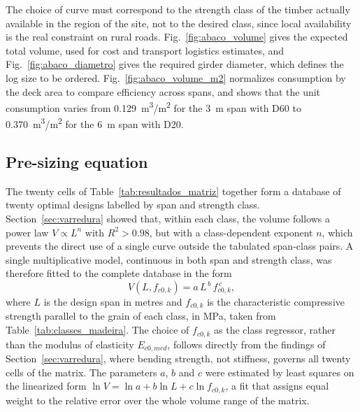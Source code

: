 The choice of curve must correspond to the strength class of the timber actually available in the region of the site, not to the desired class, since local availability is the real constraint on rural roads.
Fig.~\ref{fig:abaco_volume} gives the expected total volume, used for cost and transport logistics estimates, and Fig.~\ref{fig:abaco_diametro} gives the required girder diameter, which defines the log size to be ordered.
Fig.~\ref{fig:abaco_volume_m2} normalizes consumption by the deck area to compare efficiency across spans, and shows that the unit consumption varies from 0.129~m\textsuperscript{3}/m\textsuperscript{2} for the 3~m span with D60 to 0.370~m\textsuperscript{3}/m\textsuperscript{2} for the 6~m span with D20.

\subsection{Pre-sizing equation}\label{sec:equacao}

The twenty cells of Table~\ref{tab:resultados_matriz} together form a database of twenty optimal designs labelled by span and strength class.
Section~\ref{sec:varredura} showed that, within each class, the volume follows a power law $V \propto L^{n}$ with $R^2 > 0.98$, but with a class-dependent exponent $n$, which prevents the direct use of a single curve outside the tabulated span-class pairs.
A single multiplicative model, continuous in both span and strength class, was therefore fitted to the complete database in the form
\begin{equation}
V(L, f_{c0,k}) = a \, L^{\,b} \, f_{c0,k}^{\,c},
\label{eq:pre_dimensionamento}
\end{equation}
where $L$ is the design span in metres and $f_{c0,k}$ is the characteristic compressive strength parallel to the grain of each class, in MPa, taken from Table~\ref{tab:classes_madeira}.
The choice of $f_{c0,k}$ as the class regressor, rather than the modulus of elasticity $E_{c0,med}$, follows directly from the findings of Section~\ref{sec:varredura}, where bending strength, not stiffness, governs all twenty cells of the matrix.
The parameters $a$, $b$ and $c$ were estimated by least squares on the linearized form $\ln V = \ln a + b \ln L + c \ln f_{c0,k}$, a fit that assigns equal weight to the relative error over the whole volume range of the matrix.



